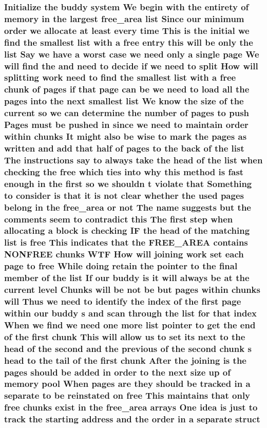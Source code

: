 \subsubsection[{\texorpdfstring{struct}{struct}}]{\setlength{\rightskip}{0pt plus 5cm}Initialize the buddy system We begin with the entirety of memory {\bf in} the largest {\bf free\+\_\+area} {\bf list} Since our minimum {\bf order} we allocate at least every time This {\bf is} the initial we find the smallest {\bf list} with a free entry this will be only the {\bf list} Say we have a worst case we need only a single {\bf page} We will find the and need to decide if we need to {\bf split} How will splitting work need to find the smallest {\bf list} with a free {\bf chunk} of {\bf pages} if that {\bf page} can be we need to load all the {\bf pages} into the next smallest {\bf list} We know the size of the current {\bf so} we can determine the number of {\bf pages} to push Pages must be pushed {\bf in} since we need to maintain {\bf order} within chunks It might also be wise to mark the {\bf pages} as written and add that half of {\bf pages} to the back of the {\bf list} The instructions say to always take the head of the {\bf list} when checking the free which ties into why this method {\bf is} fast enough {\bf in} the {\bf first} {\bf so} we shouldn t violate that Something to consider {\bf is} that {\bf it} {\bf is} {\bf not} clear whether the used {\bf pages} belong {\bf in} the {\bf free\+\_\+area} or {\bf not} The name suggests but the comments seem to contradict this The {\bf first} step when allocating a block {\bf is} checking IF the head of the matching {\bf list} {\bf is} free This indicates that the F\+R\+E\+E\+\_\+\+A\+R\+EA contains N\+O\+N\+F\+R\+EE chunks W\+TF How will joining work set each {\bf page} to free While doing retain the pointer to the final member of the {\bf list} If our buddy {\bf is} {\bf it} will always be at the current level Chunks will be {\bf not} be but {\bf pages} within chunks will Thus we need to identify the index of the {\bf first} {\bf page} within our buddy s and scan through the {\bf list} for that index When we find we need one more {\bf list} pointer to get the end of the {\bf first} {\bf chunk} This will allow us to set its next to the head of the second and the previous of the second {\bf chunk} s head to the tail of the {\bf first} {\bf chunk} After the joining {\bf is} the {\bf pages} should be added {\bf in} {\bf order} to the next size up of memory pool When {\bf pages} are they should be tracked {\bf in} a separate to be reinstated on free This maintains that only free chunks exist {\bf in} the {\bf free\+\_\+area} arrays One idea {\bf is} just to track the starting address and the {\bf order} {\bf in} a separate struct}\hypertarget{notes_8txt_aeb8c646dbe282a58600b038dd7f0fed2}{}\label{notes_8txt_aeb8c646dbe282a58600b038dd7f0fed2}


